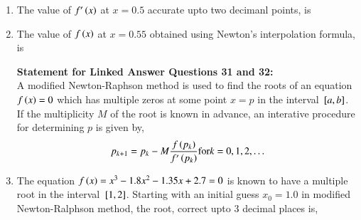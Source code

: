 \documentclass[journal]{IEEEtran}
\begin{document}
\begin{enumerate}
\item The value of $f^{\prime}\left(x\right)$ at $x=0.5$ accurate upto two decimanl points, is
	\begin{enumerate}
\end{enumerate}
\item The value of $f\left(x\right)$ at $x=0.55$ obtained using Newton's interpolation formula, is
	\begin{enumerate}
\end{enumerate}
\textbf{Statement for Linked Answer Questions 31 and 32:}\\
A modified Newton-Raphson method is used to find the roots of an equation $f\left(x\right)=0$ which has multiple zeros at some point $x=p$ in the interval ${}\left[a,b\right]$. If the multiplicity $M$ of the root is known in advance, an interative procedure for determining $p$ is given by, 
\begin{align*}
	p_{k+1}=p_k-M\frac{f\left(p_k\right)}{f^{\prime}\left(p_k\right)} \text{for} k=0,1,2,\dots
\end{align*}
\item The equation $f\left(x\right)=x^3-1.8x^2-1.35x+2.7=0$ is known to have a multiple root in the interval ${}\left[1,2\right]$. Starting with an initial guess $x_0=1.0$ in modified Newton-Ralphson method, the root, correct upto $3$ decimal places is,
	\begin{enumerate}
\end{enumerate}
\end{enumerate}
\end{document}
